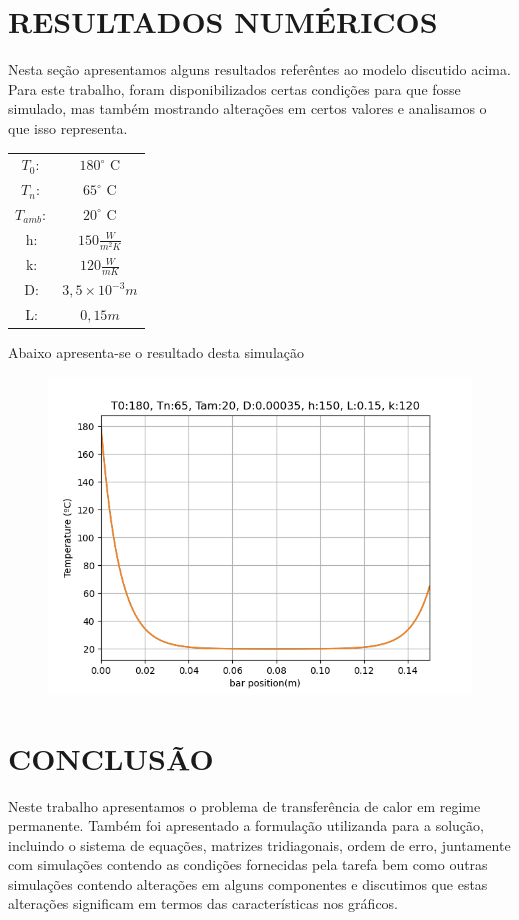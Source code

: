 \documentclass[a4paper, 12pt]{article}
\begin{document}
\section{RESULTADOS NUMÉRICOS}

Nesta seção apresentamos alguns resultados referêntes ao modelo discutido acima. 
Para este trabalho, foram disponibilizados certas condições para que fosse simulado, mas também mostrando alterações em certos valores e analisamos o que isso representa.
\begin{table}[ht!]
\centering
\begin{tabular}{cc}
  $T_0:$ & $180^\circ$ C \\
  $T_n:$ & $65^\circ$ C  \\
  $T_{amb}:$ & $20^\circ$ C  \\
   h: & $150\frac{W}{m^2K}$ \\
   k: & $120\frac{W}{mK}$ \\
   D: & $3,5 \times 10^{-3}m$ \\
   L: & $0,15m$ \\
\end{tabular}
\end{table}
Abaixo apresenta-se o resultado desta simulação
\begin{figure}[ht!]
\centering
\includegraphics[scale=0.8]{figs/fst.png}
\end{figure}
 

\section{CONCLUSÃO}

Neste trabalho apresentamos o problema de transferência de calor em regime 
permanente. Também foi apresentado a formulação utilizanda para a solução, incluindo o sistema de equações, matrizes tridiagonais, ordem de erro, juntamente com simulações contendo as condições fornecidas pela tarefa bem como outras simulações contendo alterações em alguns componentes e discutimos que estas alterações significam em termos das características nos gráficos. 
\end{document}
